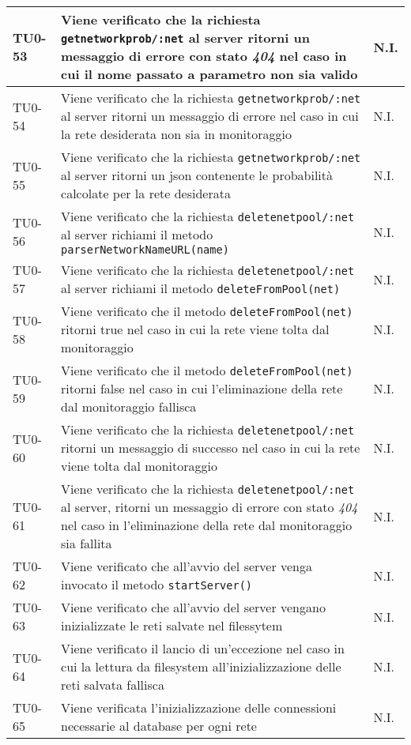 \begin{longtable}{|C{.15\textwidth}|m{.66\textwidth}|C{.10\textwidth}|}
\hline 
TU0-53 & Viene verificato che la richiesta \texttt{getnetworkprob/:net} al server ritorni un messaggio di errore con stato \textit{404} nel caso in cui il nome passato a parametro non sia valido & N.I. \\ 
\hline
{} TU0-54 & Viene verificato che la richiesta \texttt{getnetworkprob/:net} al server ritorni un messaggio di errore nel caso in cui la rete desiderata non sia in monitoraggio & N.I. \\ 
\hline 
TU0-55 & Viene verificato che la richiesta \texttt{getnetworkprob/:net} al server ritorni un json contenente le probabilità calcolate per la rete desiderata & N.I. \\ 
\hline 
{} TU0-56 & Viene verificato che la richiesta \texttt{deletenetpool/:net} al server richiami il metodo \texttt{parserNetworkNameURL(name)} & N.I. \\ 
\hline
TU0-57 & Viene verificato che la richiesta \texttt{deletenetpool/:net} al server richiami il metodo \texttt{deleteFromPool(net)} & N.I. \\ 
\hline 
{} TU0-58 & Viene verificato che il metodo \texttt{deleteFromPool(net)} ritorni true nel caso in cui la rete viene tolta dal monitoraggio & N.I. \\ 
\hline
TU0-59 & Viene verificato che il metodo \texttt{deleteFromPool(net)} ritorni false nel caso in cui l'eliminazione della rete dal monitoraggio fallisca & N.I. \\ 
\hline 
{} TU0-60 & Viene verificato che la richiesta \texttt{deletenetpool/:net} ritorni un messaggio di successo nel caso in cui la rete viene tolta dal monitoraggio & N.I. \\ 
\hline 
TU0-61 & Viene verificato che la richiesta \texttt{deletenetpool/:net} al server, ritorni un messaggio di errore con stato \textit{404} nel caso in l'eliminazione della rete dal monitoraggio sia fallita & N.I. \\ 
\hline 
{} TU0-62 & Viene verificato che all'avvio del server venga invocato il metodo \texttt{startServer()} & N.I. \\ 
\hline
TU0-63 & Viene verificato che all'avvio del server vengano inizializzate le reti salvate nel filessytem & N.I. \\ 
\hline
{}TU0-64 & Viene verificato il lancio di un'eccezione nel caso in cui la lettura da filesystem all'inizializzazione delle reti salvata fallisca & N.I. \\ 
\hline
TU0-65 & Viene verificata l'inizializzazione delle connessioni necessarie al database per ogni rete & N.I. \\ 

\end{longtable}
